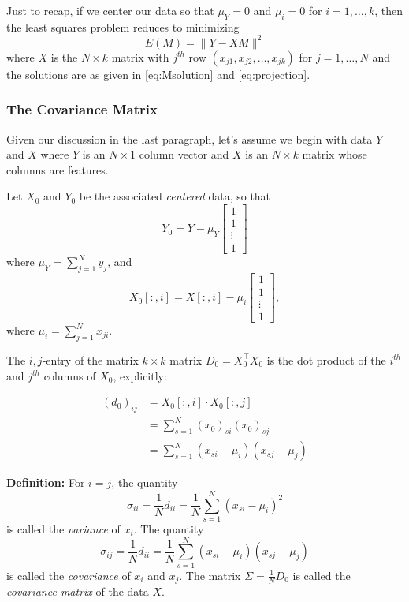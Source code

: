 \documentclass[
]{article}
\begin{document}
Just to recap, if we center our data so that \(\mu_{Y}=0\) and
\(\mu_{i}=0\) for \(i=1,\ldots, k\), then the least squares problem
reduces to minimizing \[
E(M) = \|Y-XM\|^2
\] where \(X\) is the \(N\times k\) matrix with \(j^{th}\) row
\((x_{j1},x_{j2},\ldots, x_{jk})\) for \(j=1,\ldots, N\) and the
solutions are as given in \cref{eq:Msolution} and \cref{eq:projection}.

\hypertarget{the-covariance-matrix}{%
\subsubsection{The Covariance Matrix}\label{the-covariance-matrix}}

Given our discussion in the last paragraph, let's assume we begin with
data \(Y\) and \(X\) where \(Y\) is an \(N\times 1\) column vector and
\(X\) is an \(N\times k\) matrix whose columns are features.

Let \(X_{0}\) and \(Y_{0}\) be the associated \emph{centered} data, so
that \[
Y_{0} = Y -\mu_{Y}\left[\begin{matrix} 1 \\ 1 \\ \vdots \\ 1\end{matrix}\right]
\] where \(\mu_{Y} = \sum_{j=1}^{N} y_{j}\), and \[
X_0[:,i] = X[:,i] - \mu_{i}\left[\begin{matrix} 1 \\ 1 \\ \vdots \\ 1\end{matrix}\right],
\] where \(\mu_{i} = \sum_{j=1}^{N} x_{ji}\).

The \(i,j\)-entry of the matrix \(k\times k\) matrix
\(D_0=X_0^{\intercal}X_0\) is the dot product of the \(i^{th}\) and
\(j^{th}\) columns of \(X_{0}\), explicitly:

\[\begin{aligned}
(d_0)_{ij} & = X_0[:,i]\cdot X_0[:,j]\\
&= \sum_{s=1}^{N} (x_0)_{si}(x_0)_{sj} \\
&= \sum_{s=1}^{N} (x_{si}-\mu_{i})(x_{sj}-\mu_{j}) 
\end{aligned}
\]

\textbf{Definition:} For \(i=j\), the quantity \[
\sigma_{ii} = \frac{1}{N} d_{ii} =\frac{1}{N}\sum_{s=1}^{N} (x_{si}-\mu_{i})^2
\] is called the \emph{variance} of \(x_{i}\). The quantity \[
\sigma_{ij} = \frac{1}{N} d_{ii} =\frac{1}{N}\sum_{s=1}^{N} (x_{si}-\mu_{i}) (x_{sj}-\mu_{j})
\] is called the \emph{covariance} of \(x_{i}\) and \(x_{j}\). The
matrix \(\Sigma=\frac{1}{N}D_0\) is called the \emph{covariance matrix}
of the data \(X\).
\end{document}
